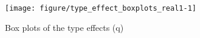 \begin{knitrout}
\color{fgcolor}\begin{figure}

{\centering \texttt{[image: figure/type\_effect\_boxplots\_real1-1]} 

}

\caption[Box plots of the type effects (q)]{Box plots of the type effects (q)}\label{fig:type_effect_boxplots_real1}
\end{figure}


\end{knitrout}

